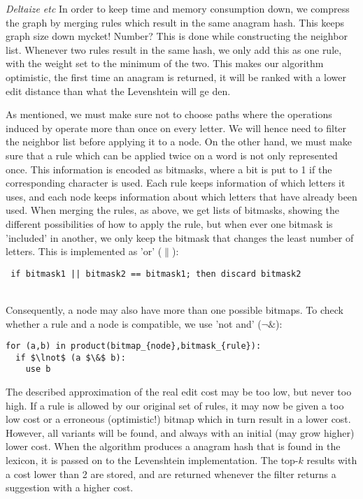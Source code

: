 \documentclass[10pt,a5paper,twoside]{article}
\begin{document}
\textit{Deltaize etc}
In order to keep time and memory consumption down, we compress the graph by
merging rules which result in the same anagram hash. This keeps graph size down
mycket! Number? 
This is done while constructing the neighbor list.
Whenever two rules result in the same hash, we only add this as one rule, with 
the weight set to the minimum of the two. This makes our algorithm optimistic, 
the first time an anagram is returned, it will be ranked with a lower edit distance
than what the Levenshtein will ge den.


As mentioned, we must %
make sure not to choose paths where the operations induced by operate more than
once on every letter. We will hence need to filter the neighbor list before
applying it to a node.
On the other hand, we must make sure
that a rule which can be applied twice on a word is not only represented once.
This information is encoded as bitmasks, where a bit is put to 1 if the
corresponding character is used. Each rule keeps information of which letters
it uses, and each node keeps information about which letters that have already been
used. When merging the rules, as above, we get lists of bitmasks, showing the different
possibilities of how to apply the rule, but when ever one bitmask is 'included' in another,
we only keep the bitmask that changes the least number of letters. This is implemented as
'or' ($\|$): \\ 
\begin{small}\verb- if bitmask1 || bitmask2 == bitmask1; then discard bitmask2 - 
\end{small} \\
Consequently, a node may also have more than one possible bitmaps.
To check whether a rule and a node is compatible, we use 'not and' ($\lnot \&$):
\begin{small}\begin{verbatim}
for (a,b) in product(bitmap_{node},bitmask_{rule}):
  if $\lnot$ (a $\&$ b):
    use b 
\end{verbatim} \end{small}
The described approximation of the real edit cost may be too low, but never too
high. If a rule is allowed by our original set of rules, it may now be given a too
low cost or a erroneous (optimistic!) bitmap which in turn result in a lower
cost. However, all variants will be found, and always with an
initial (may grow higher) lower cost.
When the algorithm produces a anagram hash that is found in the lexicon, it
is passed on to the Levenshtein implementation. The top-$k$ results with a cost
lower than 2 are stored, and are returned whenever the filter returns a
suggestion with a higher cost.
\end{document}

